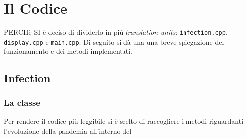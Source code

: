 \documentclass{article}
\begin{document}
\section{Il Codice}
\hspace{\parindent} PERCHè SI è deciso di
dividerlo in più \textit{translation units}: \verb|infection.cpp|,
\verb|display.cpp| e \verb|main.cpp|. Di seguito si dà una una breve 
spiegazione del funzionamento e dei metodi implementati.
\subsection{Infection}
\subsubsection{La classe}
Per rendere il codice più leggibile si è scelto di raccogliere i metodi
riguardanti l'evoluzione della pandemia all'interno del 
\end{document}
